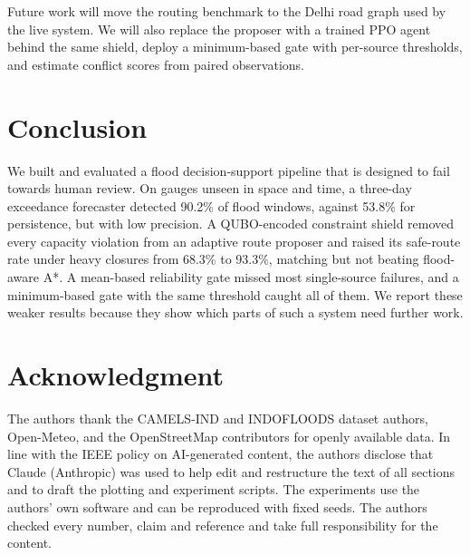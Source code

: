 \documentclass[conference]{IEEEtran}
\begin{document}
Future work will move the routing benchmark to the Delhi road graph used by the live system. We will also replace the proposer with a trained PPO agent behind the same shield, deploy a minimum-based gate with per-source thresholds, and estimate conflict scores from paired observations.

\section{Conclusion}
We built and evaluated a flood decision-support pipeline that is designed to fail towards human review. On gauges unseen in space and time, a three-day exceedance forecaster detected 90.2\% of flood windows, against 53.8\% for persistence, but with low precision. A QUBO-encoded constraint shield removed every capacity violation from an adaptive route proposer and raised its safe-route rate under heavy closures from 68.3\% to 93.3\%, matching but not beating flood-aware A*. A mean-based reliability gate missed most single-source failures, and a minimum-based gate with the same threshold caught all of them. We report these weaker results because they show which parts of such a system need further work.

\section*{Acknowledgment}
The authors thank the CAMELS-IND and INDOFLOODS dataset authors, Open-Meteo, and the OpenStreetMap contributors for openly available data.
In line with the IEEE policy on AI-generated content, the authors disclose that Claude (Anthropic) was used to help edit and restructure the text of all sections and to draft the plotting and experiment scripts. The experiments use the authors' own software and can be reproduced with fixed seeds. The authors checked every number, claim and reference and take full responsibility for the content.
\end{document}
